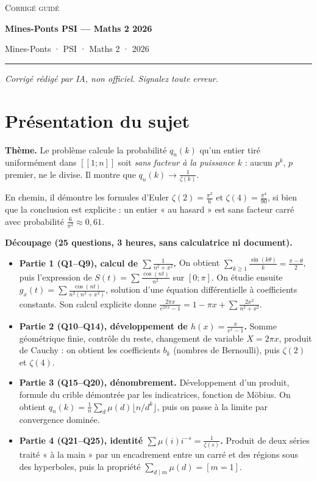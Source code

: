 \documentclass[11pt,a4paper]{article}
\providecommand{\tightlist}{\setlength{\itemsep}{0pt}\setlength{\parskip}{0pt}}
\begin{document}
\thispagestyle{plain}
\begin{center}
  {\small\scshape Corrigé guidé}\par\smallskip
  {\LARGE\bfseries Mines-Ponts PSI — Maths 2 2026\par}\medskip
  {\large Mines-Ponts · PSI · Maths 2 · 2026\par}
\end{center}
\vspace{2pt}\hrule\vspace{8pt}

\emph{Corrigé rédigé par IA, non officiel. Signalez toute erreur.}

\hypertarget{pruxe9sentation-du-sujet}{%
\section{Présentation du sujet}\label{pruxe9sentation-du-sujet}}

\textbf{Thème.} Le problème calcule la probabilité \(q_n(k)\) qu'un entier tiré uniformément dans \([\![1;n]\!]\) soit \emph{sans facteur à la puissance \(k\)} : aucun \(p^k\), \(p\) premier, ne le divise. Il montre que \(q_n(k)\to\frac1{\zeta(k)}\).

En chemin, il démontre les formules d'Euler \(\zeta(2)=\frac{\pi^2}{6}\) et \(\zeta(4)=\frac{\pi^4}{90}\), si bien que la conclusion est explicite : un entier « au hasard » est sans facteur carré avec probabilité \(\frac{6}{\pi^2}\approx0{,}61\).

\textbf{Découpage (25 questions, 3 heures, sans calculatrice ni document).}

\begin{itemize}
\tightlist
\item
  \textbf{Partie 1 (Q1--Q9), calcul de \(\sum\frac1{n^2+x^2}\).} On obtient \(\sum_{k\ge1}\frac{\sin(k\theta)}{k}=\frac{\pi-\theta}{2}\), puis l'expression de \(S(t)=\sum\frac{\cos(nt)}{n^2}\) sur \([0;\pi]\). On étudie ensuite \(g_x(t)=\sum\frac{\cos(nt)}{n^2(n^2+x^2)}\), solution d'une équation différentielle à coefficients constants. Son calcul explicite donne \(\frac{2\pi x}{e^{2\pi x}-1}=1-\pi x+\sum\frac{2x^2}{n^2+x^2}\).
\item
  \textbf{Partie 2 (Q10--Q14), développement de \(h(x)=\frac{x}{e^x-1}\).} Somme géométrique finie, contrôle du reste, changement de variable \(X=2\pi x\), produit de Cauchy : on obtient les coefficients \(b_k\) (nombres de Bernoulli), puis \(\zeta(2)\) et \(\zeta(4)\).
\item
  \textbf{Partie 3 (Q15--Q20), dénombrement.} Développement d'un produit, formule du crible démontrée par les indicatrices, fonction de Möbius. On obtient \(q_n(k)=\frac1n\sum_d\mu(d)\lfloor n/d^k\rfloor\), puis on passe à la limite par convergence dominée.
\item
  \textbf{Partie 4 (Q21--Q25), identité \(\sum\mu(i)i^{-s}=\frac1{\zeta(s)}\).} Produit de deux séries traité « à la main » par un encadrement entre un carré et des régions sous des hyperboles, puis la propriété \(\sum_{d\mid m}\mu(d)=[m=1]\).
\end{itemize}
\end{document}
